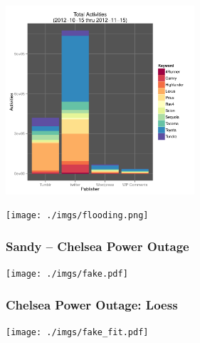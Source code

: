 \documentclass{beamer}
\begin{document}
\begin{frame}
  \begin{center}
    \includegraphics[width=7cm]{./imgs/bars_tot.pdf}
  \end{center}
\end{frame}



\begin{frame}
  \begin{center}
    \texttt{[image: ./imgs/flooding.png]}
  \end{center}
\end{frame}


\begin{frame}
\begin{center}
\end{center}
\end{frame}


\begin{frame}\frametitle{Sandy -- Chelsea Power Outage}
  \begin{center}
    \texttt{[image: ./imgs/fake.pdf]}
  \end{center}
\end{frame}

\begin{frame}\frametitle{Chelsea Power Outage: Loess}
  \begin{center}
    \texttt{[image: ./imgs/fake\_fit.pdf]}
  \end{center}
\end{frame}
\end{document}
